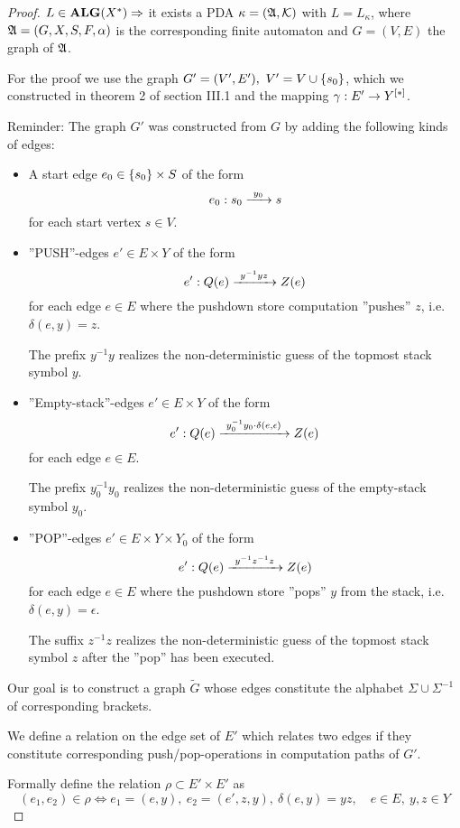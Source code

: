 \begin{proof}
$L\in \mbox{{\bf ALG}}(X^*) \Rightarrow$ it exists a PDA $\kappa=(\mbox{$\mathfrak{A}$},\mbox{$\mathcal{K}$})$ with
$L = L_\kappa$, where $\mbox{$\mathfrak{A}$}=(G, X, S, F, \alpha)$ is the corresponding finite
automaton and $G=(V, E)$ the graph of $\mbox{$\mathfrak{A}$}$.

For the proof we use the graph $G'=(V',E'),\ V' = V \cup \mbox{$\{s_0\}$}$, which we
constructed in theorem 2 of section III.1 and the mapping $\gamma: E' \to 
\mbox{${Y}^{[*]}$}$.

Reminder: The graph $G'$ was constructed from $G$ by adding the following kinds
of edges:
\begin{itemize}
  \item A start edge $e_0 \in \mbox{$\{s_0\}$} \times S$ of the form 
  \[e_0: s_0 \xrightarrow{\ {y_0}\ } s\] 
  for each start vertex $s \in V$.
  
  \item ''PUSH''-edges $e' \in E \times Y$ of the form
  \[e': Q(e) \xrightarrow{\ {y^{-1} y z}\ } Z(e)\]
  for each edge $e \in E$ where the pushdown store computation ''pushes'' $z$,
  i.e.\ $\delta(e, y) = z$. 
  
  The prefix $y^{-1} y$ realizes the non-deterministic guess of the topmost
  stack symbol $y$.
  
  \item ''Empty-stack''-edges $e' \in E \times Y$ of the form
  \[e': Q(e) \xrightarrow{\ {y_0^{-1} y_0 \cdot \delta(e, \epsilon)}\ } Z(e)\]
  for each edge $e \in E$.
  
  The prefix $y_0^{-1} y_0$ realizes the non-deterministic guess of the
  empty-stack symbol $y_0$.
  
  \item ''POP''-edges $e' \in E \times Y \times Y_0$ of the form
  \[e': Q(e) \xrightarrow{\ {y^{-1} z^{-1} z}\ } Z(e)\]
  for each edge $e \in E$ where the pushdown store ''pops'' $y$ from the stack,
  i.e.\ $\delta(e, y) = \epsilon$.
  
  The suffix $z^{-1} z$ realizes the non-deterministic guess of the topmost
  stack symbol $z$ after the ''pop'' has been executed.
\end{itemize}

Our goal is to construct a graph $\tilde{G}$ whose edges constitute the alphabet
$\Sigma \cup \Sigma^{-1}$ of corresponding brackets.

We define a relation on the edge set of $E'$ which relates two edges if they
constitute corresponding push/pop-operations in computation paths of $G'$.

Formally define the relation $\rho \subset E' \times E'$ as
\[ (e_1, e_2) \in \rho \iff e_1 = (e, y),\ e_2 = (e', z, y),\ \delta(e, y) = y
z,\quad e \in E,\ y,z \in Y \]


\end{proof}
